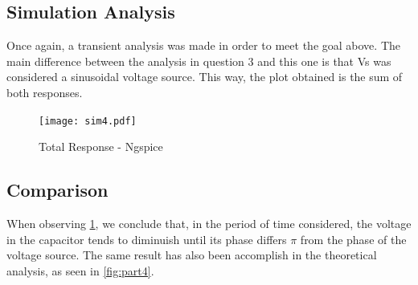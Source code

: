 \subsection{Simulation Analysis}
Once again, a transient analysis was made in order to meet the goal above. The main difference between the analysis in question 3 and this one is that Vs was considered a sinusoidal voltage source. This way, the plot obtained is the sum of both responses.

\begin{figure}[h] \centering
\texttt{[image: sim4.pdf]}
\caption{Total Response - Ngspice}
\label{fig:sim4}
\end{figure}

\subsection{Comparison}
 When observing \ref{fig:sim4}, we conclude that, in the period of time considered, the voltage in the capacitor tends to diminuish until its phase differs $\pi$ from the phase of the voltage source. The same result has also been accomplish in the theoretical analysis, as seen in \ref{fig:part4}.

\newpage
